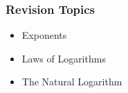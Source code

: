 \documentclass{beamer}
\begin{document}
\begin{frame}
	\frametitle{Revision Topics}
	\begin{itemize}
		\item Exponents
		\item Laws of Logarithms
		\item The Natural Logarithm
	\end{itemize}
\end{frame}
%	
%	

\end{document}
